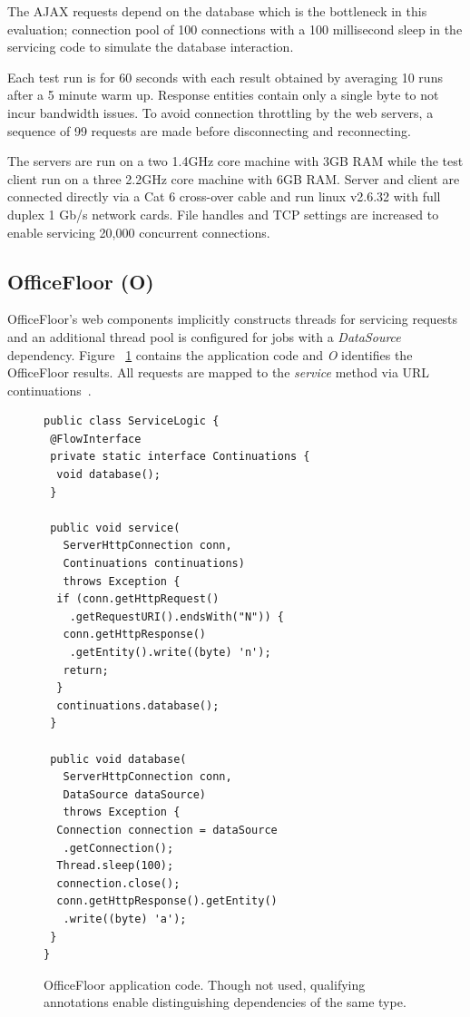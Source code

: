 \documentclass[conference]{ieee/IEEEtran}
\begin{document}
The AJAX requests depend on the database which is the bottleneck in this
evaluation; connection pool of 100 connections with a 100 millisecond sleep in
the servicing code to simulate the database interaction.

Each test run is for 60 seconds with each result obtained by averaging 10 runs
after a 5 minute warm up.  Response entities contain only a single byte to not
incur bandwidth issues.  To avoid connection throttling by the web servers, a
sequence of 99 requests are made before disconnecting and reconnecting.

The servers are run on a two 1.4GHz core machine with 3GB RAM while the test
client run on a three 2.2GHz core machine with 6GB RAM.  Server and client are
connected directly via a Cat 6 cross-over cable and run linux v2.6.32 with full
duplex 1 Gb/s network cards.  File handles and TCP settings are increased to
enable servicing 20,000 concurrent connections.

\subsection{OfficeFloor (O)}
OfficeFloor's web components implicitly constructs threads for servicing
requests and an additional thread pool is configured for jobs with a
\textit{DataSource} dependency.  Figure ~\ref{fig:officefloor_code} contains the
application code and \textit{O} identifies the OfficeFloor results.  All
requests are mapped to the \textit{service} method via URL
continuations~\cite{url-continuation}.

\begin{figure}[!t]
\begin{verbatim}
public class ServiceLogic {
 @FlowInterface
 private static interface Continuations {
  void database();
 }

 public void service(
   ServerHttpConnection conn, 
   Continuations continuations) 
   throws Exception { 
  if (conn.getHttpRequest()
    .getRequestURI().endsWith("N")) {
   conn.getHttpResponse()
    .getEntity().write((byte) 'n');
   return;
  }
  continuations.database();
 }

 public void database(
   ServerHttpConnection conn,
   DataSource dataSource) 
   throws Exception {
  Connection connection = dataSource
   .getConnection();
  Thread.sleep(100);
  connection.close();
  conn.getHttpResponse().getEntity()
   .write((byte) 'a');
 }
}
\end{verbatim}
\caption{OfficeFloor application code. Though not used, qualifying
annotations enable distinguishing dependencies of the same type.}
\label{fig:officefloor_code}
\end{figure}
\end{document}
